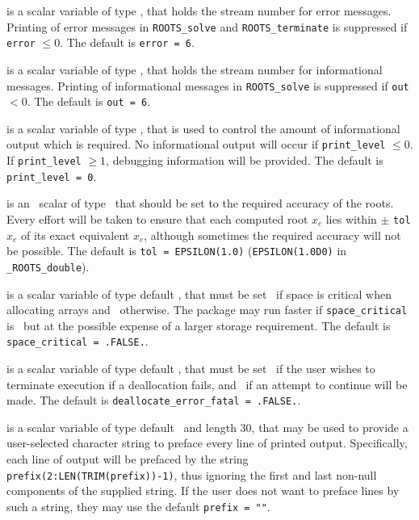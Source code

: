 \documentclass{galahad}
\newcommand{\packagename}{ROOTS}
\newcommand{\fullpackagename}{\libraryname\_\packagename}
\begin{document}
\begin{description}

 is a scalar variable of type \integer, that holds the
stream number for error messages. Printing of error messages in 
{\tt \packagename\_solve} and {\tt \packagename\_terminate} is suppressed if 
{\tt error} $\leq 0$.
The default is {\tt error = 6}.

 is a scalar variable of type \integer, that holds the
stream number for informational messages. Printing of informational messages in 
{\tt \packagename\_solve} is suppressed if {\tt out} $< 0$.
The default is {\tt out = 6}.

 is a scalar variable of type \integer, that is used
to control the amount of informational output which is required. No 
informational output will occur if {\tt print\_level} $\leq 0$. If 
{\tt print\_level} $\geq 1$, debugging information will be provided.
The default is {\tt print\_level = 0}.

 is an \intentin\ scalar of type \realdp\, that should
be set to the required accuracy of the roots. Every effort
will be taken to ensure that each computed root $x_c$ lies within
$\pm$ {\tt tol} $x_e$ of 
its exact equivalent $x_e$, although sometimes the required accuracy will not
be possible.
The default is {\tt tol = EPSILON(1.0)} ({\tt EPSILON(1.0D0)} in 
{\tt \fullpackagename\_double}).

 is a scalar variable of type default \logical, 
that must be set \true\ if space is critical when allocating arrays
and  \false\ otherwise. The package may run faster if 
{\tt space\_critical} is \false\ but at the possible expense of a larger
storage requirement. The default is {\tt space\_critical = .FALSE.}.

 is a scalar variable of type default \logical, 
that must be set \true\ if the user wishes to terminate execution if
a deallocation  fails, and \false\ if an attempt to continue
will be made. The default is {\tt deallocate\_error\_fatal = .FALSE.}.

 is a scalar variable of type default \character\
and length 30, that may be used to provide a user-selected 
character string to preface every line of printed output. 
Specifically, each line of output will be prefaced by the string 
{\tt prefix(2:LEN(TRIM(prefix))-1)},
thus ignoring the first and last non-null components of the
supplied string. If the user does not want to preface lines by such
a string, they may use the default {\tt prefix = ""}.

\end{description}
\end{document}
